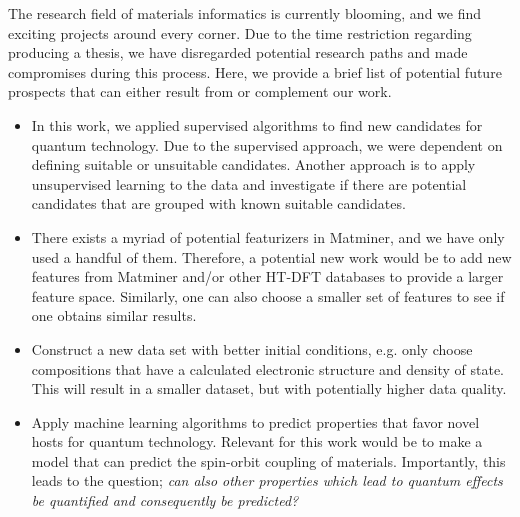 The research field of materials informatics is currently blooming, and we find exciting projects around every corner.
Due to the time restriction regarding producing a thesis, we have  disregarded potential research paths and made compromises during this process. Here, we provide a brief list of potential future prospects that can either result from or complement our work.
\begin{itemize}
  \item In this work, we applied supervised algorithms to find new candidates for quantum technology. Due to the supervised approach, we were dependent on defining suitable or unsuitable candidates. Another approach is to apply unsupervised learning to the data and investigate if there are potential candidates that are grouped with known suitable candidates.
  \item There exists a myriad of potential featurizers in Matminer, and we have only used a handful of them. Therefore, a potential new work would be to add new features from Matminer and/or other HT-DFT databases to provide a larger feature space. Similarly, one can also choose a smaller set of features to see if one obtains similar results.
  \item Construct a new data set with better initial conditions, e.g. only choose compositions that have a calculated electronic structure and density of state. This will result in a smaller dataset, but with potentially higher data quality.
  \item Apply machine learning algorithms to predict properties that favor novel hosts for quantum technology. Relevant for this work would be to make a model that can predict the spin-orbit coupling of materials. Importantly, this leads to the question; \textit{can also other properties which lead to quantum effects be quantified and consequently be predicted?}
\end{itemize}


